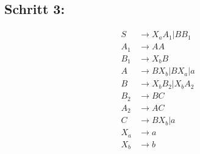 \documentclass[12pt, a4paper]{article}
\begin{document}
\subsection*{Schritt 3:}
\begin{align*}
S &\rightarrow X_aA_1|BB_1 \\
A_1 &\rightarrow AA \\
B_1 &\rightarrow X_bB \\
A &\rightarrow BX_b | BX_a | a \\
B &\rightarrow X_bB_2|X_bA_2 \\
B_2 &\rightarrow BC \\
A_2 &\rightarrow AC \\
C &\rightarrow BX_b|a \\
X_a &\rightarrow a \\
X_b &\rightarrow b \\
\end{align*}
\end{document}
